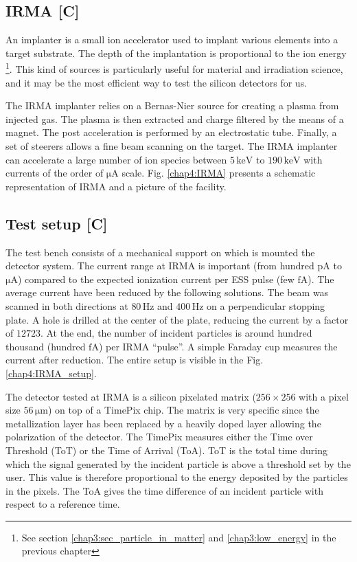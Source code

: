 \begin{refsection}
  \subsection{IRMA [C]}
  An implanter is a small ion accelerator used to implant various elements into a target substrate. The depth of the implantation is proportional to the ion energy \footnote{See section \ref{chap3:sec_particle_in_matter} and \ref{chap3:low_energy} in the previous chapter}. This kind of sources is particularly useful for material and irradiation science, and it may be the most efficient way to test the silicon detectors for us.

  The IRMA implanter \cite{Chaumont1981} relies on a Bernas-Nier source \cite{Paris1981} for creating a plasma from injected gas. The plasma is then extracted and charge filtered by the means of a magnet. The post acceleration is performed by an electrostatic tube. Finally, a set of steerers allows a fine beam scanning on the target. The IRMA implanter can accelerate a large number of ion species between $5 \,\mathrm{keV}$ to $190 \,\mathrm{keV}$ with currents of the order of $\mathrm{\mu A}$ scale. Fig. \ref{chap4:IRMA} presents a schematic representation of IRMA and a picture of the facility.
  

  \subsection{Test setup [C]}

  The test bench consists of a mechanical support on which is mounted the detector system. The current range at IRMA is important (from hundred $\mathrm{pA}$ to $\mathrm{\mu A}$) compared to the expected ionization current per ESS pulse (few $\mathrm{fA}$). The average current have been reduced by the following solutions. The beam was scanned in both directions at $80 \,\mathrm{Hz}$ and $400\,\mathrm{Hz}$ on a perpendicular stopping plate. A hole is drilled at the center of the plate, reducing the current by a factor of $12723$. At the end, the number of incident particles is around hundred thousand (hundred $\mathrm{fA}$) per IRMA “pulse”. A simple Faraday cup measures the current after reduction. The entire setup is visible in the Fig. \ref{chap4:IRMA_setup}.

  

  The detector tested at IRMA is a silicon pixelated matrix ($256 \times 256$ with a pixel size $56\,\mathrm{\mu m}$) on top of a TimePix chip. The matrix is ​​very specific since the metallization layer has been replaced by a heavily doped layer allowing the polarization of the detector. The TimePix measures either the Time over Threshold (ToT) or the Time of Arrival (ToA). ToT is the total time during which the signal generated by the incident particle is above a threshold set by the user. This value is therefore proportional to the energy deposited by the particles in the pixels. The ToA gives the time difference of an incident particle with respect to a reference time.


\end{refsection}
